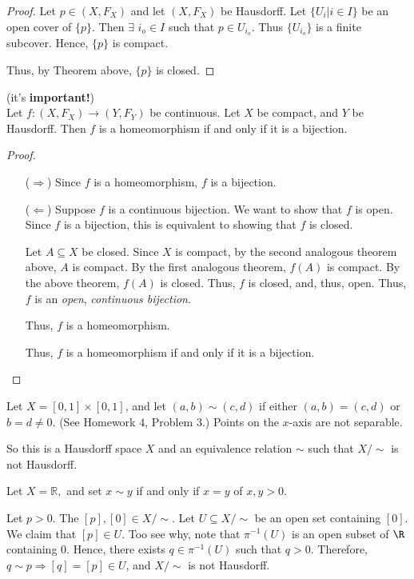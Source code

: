  \begin{proof} 
 Let $p \in (X, F_X)$ and let $(X, F_X)$ be Hausdorff. Let $\{ U_i|i \in I\}$ be an open cover of $\{ p\}$. Then $\exists$ $i_o \in I$ such that $p \in U_{i_o}$. Thus $\{ U_{i_o} \}$ is a finite subcover. Hence, $\{ p \}$ is compact.

 Thus, by Theorem above, $\{ p\}$ is closed.
 \end{proof}
     
 \begin{lemma} (it's {\bf important!})\\
 Let $f : (X, F_X) \to (Y, F_Y)$ be continuous. Let $X$ be compact, and $Y$ be Hausdorff. Then $f$ is a homeomorphism if and only if it is a bijection.
 \end{lemma}
 
 \begin{proof}
 \begin{itemize}
 \item[($\Rightarrow$)] Since $f$ is a homeomorphism, $f$ is a bijection.
 \item[($\Leftarrow$)] Suppose $f$ is a continuous bijection.  We want to show that $f$ is open. Since $f$ is a bijection, this is equivalent to showing that $f$ is closed.

     Let $A \subseteq X$ be closed. Since $X$ is compact, by the second analogous theorem above, $A$ is compact. By the first analogous theorem, $f(A)$ is compact. By the above theorem, $f(A)$ is closed. Thus, $f$ is closed, and, thus, open. Thus, $f$ is an \emph{open}, \emph{continuous bijection}.

     Thus, $f$ is a homeomorphism.
     
     Thus, $f$ is a homeomorphism if and only if it is a bijection.
\end{itemize}
\end{proof}

\begin{example}
Let $X=[0,1]\times[0,1]$, and let $(a,b)\sim(c,d)$ if either $(a,b)=(c,d)$ or $b=d\neq 0.$  (See Homework $4$, Problem $3$.)  Points on the $x$-axis are not separable.
 
\placeholder
So this is a Hausdorff space $X$ and an equivalence relation $\sim$ such that $X/\sim$ is not Hausdorff.
\end{example}

\begin{example}
 Let $X=\mathbb{R},$ and set $x \sim y$ if and only if $x=y$ of $x,y>0.$ 

\placeholder

Let $p>0.$  The $[p],[0]\in X/\sim$.  Let $U \subseteq X/\sim$ be an open set containing $[0].$  We claim that $[p]\in U$.  Too see why, note that $\pi^{-1}(U)$ is an open subset of $\R$ containing $0$.  Hence, there exists $q \in \pi^{-1}(U)$ such that $q>0.$  Therefore, $q \sim p \Rightarrow [q]=[p]\in U$, and $X/\sim$ is not Hausdorff.
\end{example}

